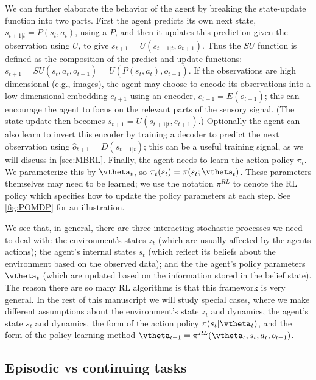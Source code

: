 We can further elaborate the behavior of the agent by breaking the state-update
function into two parts.
First the agent predicts its own next state, $s_{t+1|t}=P(s_t,a_t)$,
using a  $P$, and then it updates
this prediction given the observation using  $U$,
to give $s_{t+1}=U(s_{t+1|t},o_{t+1})$.
Thus the $SU$ function is defined as the composition of the predict and update
functions: $s_{t+1} = SU(s_t,a_t,o_{t+1})=U(P(s_t,a_t), o_{t+1})$.
If the observations are high dimensional (e.g., images),
the agent may choose to encode its observations into a low-dimensional
embedding $e_{t+1}$ using an encoder, $e_{t+1}=E(o_{t+1})$;
this can encourage the agent to focus on the relevant
parts of the sensory signal.
(The state update then becomes  $s_{t+1}=U(s_{t+1|t},e_{t+1})$.)
Optionally the agent can also learn to invert this encoder by training
a decoder to predict the next observation using $\hat{o}_{t+1}=D(s_{t+1|t})$;
this can be a useful training signal, as we will discuss in \cref{sec:MBRL}.
Finally, the agent needs to learn the action policy $\pi_t$.
We parameterize this by $\vtheta_t$,
so $\pi_t(s_t)=\pi(s_t;\vtheta_t)$. These parameters themselves may need to
be learned; we use the notation $\pi^{RL}$ to denote the RL policy
which specifies how to update the policy parameters at each step.
See \cref{fig:POMDP} for an illustration.

We see that, in general, there are three interacting stochastic processes
we need to deal with:
the environment's states $z_t$ (which are usually affected
by the agents actions);
the  agent's internal states $s_t$
(which reflect its beliefs about the environment based on the observed data);
and the the agent's policy parameters $\vtheta_t$
(which are updated based on the information stored in the belief state).
The reason
there are so many RL algorithms is that this framework is very general.
In the rest of this manuscript we will study special cases,
where we make different assumptions about the environment's state $z_t$ and dynamics,
the agent's state $s_t$ and dynamics,
the form of the action policy $\pi(s_t|\vtheta_t)$,
and  the form of the policy learning method $\vtheta_{t+1}=\pi^{RL}(\vtheta_t,s_t, a_t, o_{t+1})$.



\subsection{Episodic vs continuing tasks}

